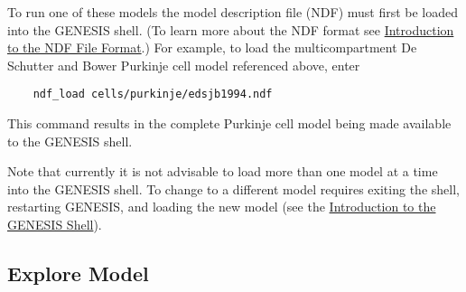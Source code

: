 \documentclass[12pt]{article}
\begin{document}
To run one of these models the model description file (NDF) must first be loaded into the GENESIS shell.  (To learn more about the NDF format see  \href{../ndf-file-format/ndf-file-format.pdf}{Introduction to the NDF File Format}.) For example, to load the multicompartment De Schutter and Bower Purkinje cell model referenced above, enter
\begin{verbatim}
    ndf_load cells/purkinje/edsjb1994.ndf
\end{verbatim}
This command results in the complete Purkinje cell model being made available to the GENESIS shell.

Note that currently it is not advisable to load more than one model at a time into the GENESIS shell. To change to a different model requires exiting the shell, restarting GENESIS, and loading the new model (see the \href{../gshell/gshell.pdf}{Introduction to the GENESIS Shell}).

\subsection*{Explore Model}
\end{document}
